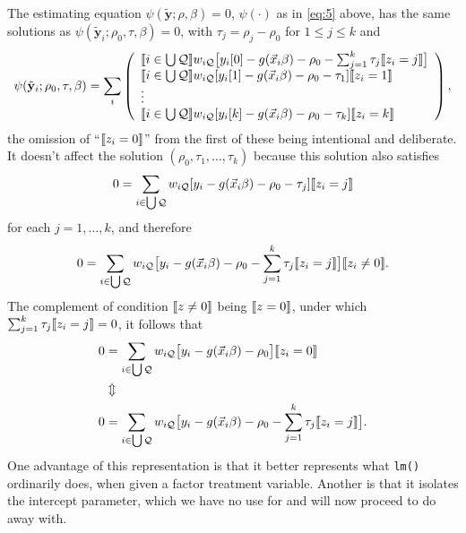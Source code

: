 \documentclass{article}
\DeclarePairedDelimiter{\indicator}{\llbracket}{\rrbracket}
\begin{document}
The estimating equation $\psi(\tilde{\mathbf{y}}; \rho, \beta)=0$,
$\psi(\cdot)$ as in \eqref{eq:5} above, has the same solutions as $\psi(\tilde{\mathbf{y}}_{i};
  \rho_{0}, \tau, \beta)=0$, with $\tau_{j}=\rho_{j}-\rho_{0}$ for
$1\leq j \leq k$ and
\begin{equation*}
         \psi(\tilde{\mathbf{y}}_{i};
  \rho_{0}, \tau, \beta) =
         \sum_{i}\left( \begin{array}{l}
           \indicator{i \in \bigcup \mathcal{Q}}w_{i\mathcal{Q}}\big[y_{i}[0] - g(\vec{x}_{i}\beta)-
                  \rho_{0} - \sum_{j=1}^{k}\tau_{j}\indicator{z_{i}=j}\big]\\
           \indicator{i \in \bigcup \mathcal{Q}}w_{i\mathcal{Q}}[y_{i}[1] - g(\vec{x}_{i}\beta)-
                  \rho_{0}-\tau_{1}]\indicator{z_{i}=1}\\
                  \vdots \\
           \indicator{i \in \bigcup \mathcal{Q}}w_{i\mathcal{Q}}[y_{i}[k] - g(\vec{x}_{i}\beta)-
                 \rho_{0} - \tau_{k}]\indicator{z_{i}=k}\\                  
                \end{array}\right), 
\end{equation*}
the omission of ``$\indicator{z_{i}=0}$'' from the first of these
being intentional and deliberate. It doesn't affect the solution
$(\rho_{0}, \tau_{1}, \ldots, \tau_{k})$
because this solution also satisfies
\begin{equation*}
       0 = \sum_{i \in \bigcup \mathcal{Q}}w_{i\mathcal{Q}}[y_{i} - g(\vec{x}_{i}\beta)-
                  \rho_{0}-\tau_{j}]\indicator{z_{i}=j}
\end{equation*}
for each $j=1, \ldots, k$, and therefore
\begin{equation*}
       0 = \sum_{i \in \bigcup \mathcal{Q}}w_{i\mathcal{Q}}\big[y_{i} - g(\vec{x}_{i}\beta)-
                  \rho_{0}-\sum_{j=1}^{k}\tau_{j}\indicator{z_{i}=j}\big]\indicator{z_{i}
                  \neq 0}.
\end{equation*}
The complement of condition $\indicator{z\neq 0}$ being
$\indicator{z=0}$, under which $\sum_{j=1}^{k}\tau_{j}\indicator{z_{i}=j}=0$, it follows that
\begin{align*}
         0 &= \sum_{i \in \bigcup \mathcal{Q}}w_{i\mathcal{Q}}\big[y_{i} - g(\vec{x}_{i}\beta)-
                  \rho_{0}\big]\indicator{z_{i}
             =0}\\
           & \Updownarrow \\
         0 &= \sum_{i \in \bigcup \mathcal{Q}}w_{i\mathcal{Q}}\big[y_{i} - g(\vec{x}_{i}\beta)-
                  \rho_{0} - \sum_{j=1}^{k}\tau_{j}\indicator{z_{i}=j}\big].
\end{align*}
One advantage of this representation is that it better represents what
\texttt{lm()} ordinarily does, when given a factor treatment
variable.  Another is that it isolates the intercept parameter, which
we have no use for and will now proceed to do away with. 
\end{document}
